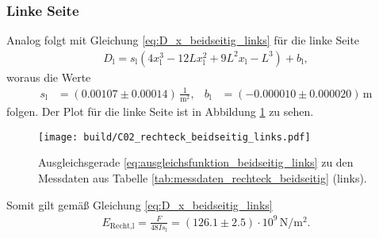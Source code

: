 \subsubsection{Linke Seite}
\label{sec:rechteck_beidseitig_links}
Analog folgt mit Gleichung \eqref{eq:D_x_beidseitig_links} für die linke Seite
\begin{align}
    D_\text{l} = s_\text{l} \left(4 x_\text{l}^3 - 12 L x_\text{l}^2 + 9 L^2 x_\text{l} - L^3\right) + b_\text{l}, 
    \label{eq:ausgleichsfunktion_beidseitig_links}
\end{align}
woraus die Werte 
\begin{align*}
    s_\text{l} &= (\num{0.00107} \pm \num{0.00014}) \, \frac{1}{\unit{\meter^2}}, & 
    b_\text{l} &= (\num{-0.000010} \pm \num{0.000020}) \, \unit{\meter}
\end{align*}
folgen.
Der Plot für die linke Seite ist in Abbildung \ref{fig:plot_rechteck_beidseitig_links}
zu sehen.
%
\begin{figure}[H]
    \centering
    \texttt{[image: build/C02\_rechteck\_beidseitig\_links.pdf]}
    \caption{Ausgleichsgerade \eqref{eq:ausgleichsfunktion_beidseitig_links} zu den Messdaten aus Tabelle \ref{tab:messdaten_rechteck_beidseitig} (links).}
    \label{fig:plot_rechteck_beidseitig_links}
\end{figure}

\noindent
Somit gilt gemäß Gleichung \eqref{eq:D_x_beidseitig_links}
\begin{align}
    E_\text{Recht,l} = \frac{F}{48 I s_\text{l}} = (\num{126.1} \pm \num{2.5}) \cdot 10^9 \, \unit{\newton\per\meter^2}.
\end{align}
